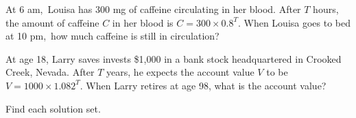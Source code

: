 \documentclass[12pt,fleqn]{exam}
\newcommand\AM{{\sc am}}
\newcommand\PM{{\sc pm}}
\begin{document}
\begin{questions}
\begin{solution}[2.5in]
\end{solution}


\question [2]  At 6 \AM,\, Louisa has 300 mg of caffeine circulating 
in her blood. After $T$ hours, the amount of caffeine $C$ in her blood is
\(
     C = 300  \times  0.8^T
\).
When Louisa goes to bed at 10 \PM,\, how much caffeine is
still in circulation?
\begin{solution}[1.5in]

\end{solution}


\question At age 18, Larry saves invests \$1,000 in a bank stock headquartered in Crooked Creek, Nevada.
After $T$ years, he expects the account value $V$ to be \mbox{$V = 1000 \times 1.082^T$}. When Larry retires at age 98,
what is the account value?


\question Find each solution set.

\end{questions}

\end{document}
